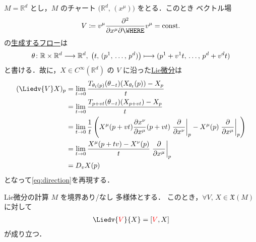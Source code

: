 \documentclass[geometry_main]{subfiles}
\begin{document}
\begin{myexample}[]{}
    $M = \mathbb{R}^d$ とし，$M$ のチャート $\bigl(\mathbb{R}^d,\, (x^\mu)\bigr)$ をとる．このとき \cinfty ベクトル場
    \begin{align}
        V \coloneqq v^\mu \pdv{}{x^\mu} \WHERE v^\mu = \mathrm{const}.
    \end{align}
    の\hyperref[thm:fundamental-flow]{生成するフロー}は
    \begin{align}
        \theta \colon \mathbb{R} \times \mathbb{R}^d \longrightarrow \mathbb{R}^d,\; \bigl(t,\, (p^1,\, \dots,\, p^d)\bigr) \longmapsto (p^1 + v^1 t,\, \dots,\, p^d + v^d t)
    \end{align}
    と書ける．故に，$X \in C^\infty(\mathbb{R}^d)$ の $V$ に沿った\hyperref[def:Liedv]{Lie微分}は
    \begin{align}
        (\Liedv{V} X)_p 
        &= \lim_{t \to 0} \frac{T_{\theta_t(p)}(\theta_{-t})(X_{\theta_t}(p)) - X_p}{t} \\
        &= \lim_{t \to 0} \frac{T_{p+vt}(\theta_{-t})(X_{p+vt}) - X_p}{t} \\
        &= \lim_{t \to 0} \frac{1}{t} \left( X^\mu (p + vt) \pdv{x^\nu}{x^\mu}()(p+vt) \eval{\pdv{}{x^\nu}}_p - X^\mu(p) \eval{\pdv{}{x^\mu}}_p \right) \\
        &= \lim_{t \to 0} \frac{X^\mu(p+tv) - X^\nu(p)}{t} \eval{\pdv{}{x^\mu}}_p \\
        &= D_v X (p)
    \end{align}
    となって\eqref{eq:direction}を再現する．
\end{myexample}

\begin{mytheo}[label=thm:Liedv]{Lie微分の計算}
    $M$ を境界あり/なし \cinfty 多様体とする．
    このとき，$\forall V,\, X \in \mathfrak{X}(M)$ に対して
    \begin{align}
        \Liedv{\textcolor{red}{V}}{X} = \comm{\textcolor{red}{V}}{X}
    \end{align}
    が成り立つ．
\end{mytheo}
\end{document}
